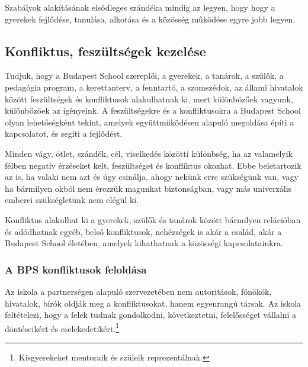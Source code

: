 Szabályok alakításának elsődleges szándéka mindig az legyen, hogy
hogy a gyerekek fejlődése, tanulása, alkotása és a közösség működése egyre jobb
legyen.

\subsection{Konfliktus, feszültségek kezelése}
\label{sec:konfliktusok_kezelese}
Tudjuk, hogy a Budapest School szereplői, a gyerekek, a tanárok, a szülők,
a pedagógia program, a kerettanterv, a fenntartó, a szomszédok, az állami
hivatalok  között feszültségek és konfliktusok alakulhatnak ki, mert
különbözőek vagyunk, különbözőek az igényeink. A feszültségekre és a
konfliktusokra a Budapest School olyan lehetőségként tekint, amelyek
együttműködésen alapuló megoldása építi a kapcsolatot, és segíti a fejlődést.

Minden vágy, ötlet, szándék, cél, viselkedés közötti különbség, ha az
valamelyik
félben negatív érzéseket kelt, feszültséget és konfliktus okozhat. Ebbe
beletartozik az is, ha valaki nem
azt és úgy csinálja, ahogy nekünk erre szükségünk van, vagy ha bármilyen
okból nem érezzük magunkat biztonságban, vagy más univerzális emberei
szükségletünk \citep{rosenberg2003nonviolent} nem elégül ki.

Konfliktus alakulhat ki a gyerekek, szülők és tanárok között bármilyen
relációban és adódhatnak egyéb, belső konfliktusok, nehézségek is akár a
család, akár a Budapest School életében, amelyek kihathatnak a közösségi
kapcsolatainkra.

\subsubsection{A BPS konfliktusok feloldása}

Az iskola a partnerségen alapuló szervezetében nem autoritások, főnökök,
hivatalok, bírók oldják
meg a konfliktusokat, hanem
egyenrangú társak. Az iskola feltételezi, hogy a felek tudnak gondolkodni,
következtetni,
felelősséget vállalni a döntéseikért és cselekedetikért.\footnote{Kisgyerekeket
      mentoraik és szüleik reprezentálnak.}

